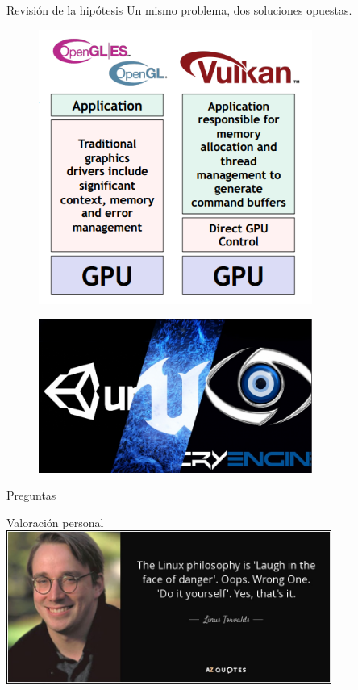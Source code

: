 \documentclass{beamer}
\begin{document}
\begin{frame}{Revisión de la hipótesis}
  Un mismo problema, dos soluciones opuestas.
  \vfill
  \begin{minipage}{0.45\textwidth}
    \centering
    \begin{figure}[h]
      \includegraphics[width=0.8\textwidth]{img/vulkan_info}
    \end{figure}
  \end{minipage}
  \begin{minipage}{0.45\textwidth}
    \centering
    \begin{figure}[h]
      \includegraphics[width=0.8\textwidth]{img/engines}
    \end{figure}
    \end{minipage}
\end{frame}
\begin{frame}{Preguntas}
\end{frame}
\begin{frame}{Valoración personal}
  \centering
  \includegraphics[width=0.8\textwidth]{img/linus}
\end{frame}
\end{document}
